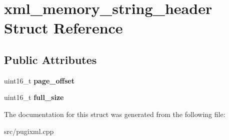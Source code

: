 \hypertarget{structxml__memory__string__header}{}\section{xml\+\_\+memory\+\_\+string\+\_\+header Struct Reference}
\label{structxml__memory__string__header}
\subsection*{Public Attributes}
\begin{DoxyCompactItemize}
\item 
\mbox{\label{structxml__memory__string__header_a0cc274672f1263f73eeb6bf839bf96ee}} 
uint16\+\_\+t {\bfseries page\+\_\+offset}
\item 
\mbox{\label{structxml__memory__string__header_abbb48a709081e6610dffad322499e3f7}} 
uint16\+\_\+t {\bfseries full\+\_\+size}
\end{DoxyCompactItemize}


The documentation for this struct was generated from the following file\+:\begin{DoxyCompactItemize}
\item 
src/pugixml.\+cpp\end{DoxyCompactItemize}

